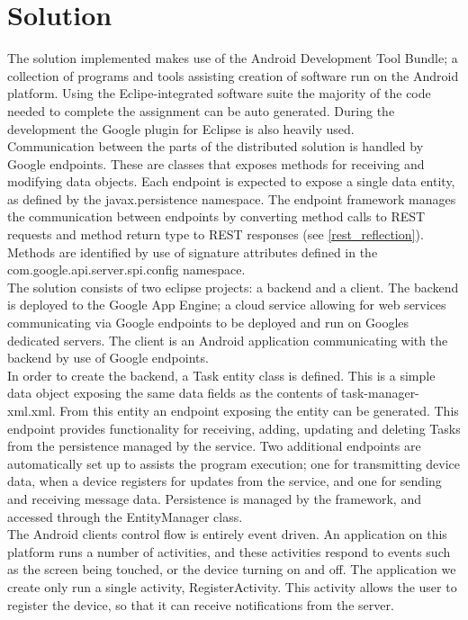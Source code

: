\section{Solution}
The solution implemented makes use of the Android Development Tool Bundle; a collection of programs and tools assisting creation of software run on the Android platform. Using the Eclipe-integrated software suite the majority of the code needed to complete the assignment can be auto generated. During the development the Google plugin for Eclipse is also heavily used.\\
Communication between the parts of the distributed solution is handled by Google endpoints. These are classes that exposes methods for receiving and modifying data objects. Each endpoint is expected to expose a single data entity, as defined by the javax.persistence namespace. The endpoint framework manages the communication between endpoints by converting method calls to REST requests and method return type to REST responses (see \ref{rest_reflection}). Methods are identified by use of signature attributes defined in the com.google.api.server.spi.config namespace.\\
The solution consists of two eclipse projects: a backend and a client. The backend is deployed to the Google App Engine; a cloud service allowing for web services communicating via Google endpoints to be deployed and run on Googles dedicated servers. The client is an Android application communicating with the backend by use of Google endpoints.\\
In order to create the backend, a Task entity class is defined. This is a simple data object exposing the same data fields as the contents of task-manager-xml.xml. From this entity an endpoint exposing the entity can be generated. This endpoint provides functionality for receiving, adding, updating and deleting Tasks from the persistence managed by the service. Two additional endpoints are automatically set up to assists the program execution; one for transmitting device data, when a device registers for updates from the service, and one for sending and receiving message data. Persistence is managed by the framework, and accessed through the EntityManager class.\\
The Android clients control flow is entirely event driven. An application on this platform runs a number of activities, and these activities respond to events such as the screen being touched, or the device turning on and off. The application we create only run a single activity, RegisterActivity. This activity allows the user to register the device, so that it can receive notifications from the server. \\
